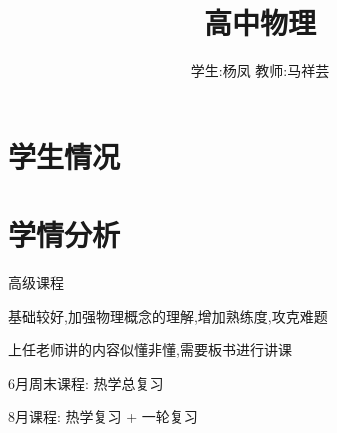 \documentclass{article}
\title{高中物理}
\author{学生:\quad 杨凤 \quad 教师:\quad 马祥芸}
\begin{document}
    \maketitle
    \tableofcontents
    \newpage

    \section{学生情况}
    \begin{center}
    \end{center}
        
    \section{学情分析}
    高级课程

    基础较好,加强物理概念的理解,增加熟练度,攻克难题

    上任老师讲的内容似懂非懂,需要板书进行讲课

    6月周末课程:
    热学总复习

    8月课程:
    热学复习 + 一轮复习
\end{document}
